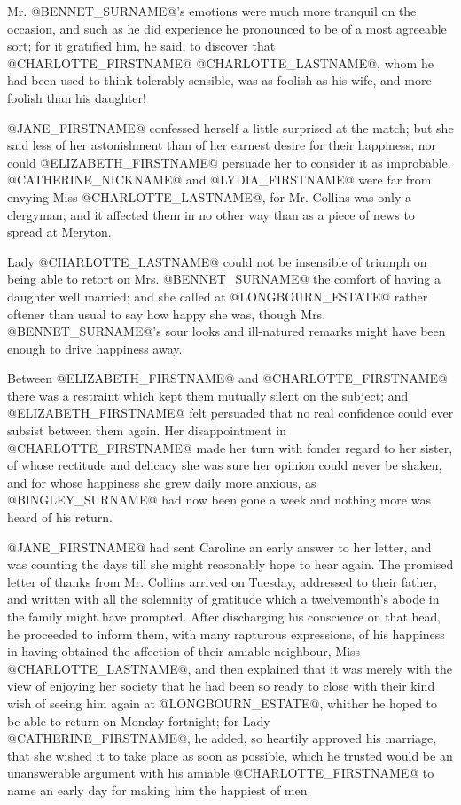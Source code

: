 Mr. @BENNET_SURNAME@'s emotions were much more tranquil on the occasion, and such
as he did experience he pronounced to be of a most agreeable sort; for
it gratified him, he said, to discover that @CHARLOTTE_FIRSTNAME@ @CHARLOTTE_LASTNAME@, whom he had
been used to think tolerably sensible, was as foolish as his wife, and
more foolish than his daughter!

@JANE_FIRSTNAME@ confessed herself a little surprised at the match; but she said
less of her astonishment than of her earnest desire for their happiness;
nor could @ELIZABETH_FIRSTNAME@ persuade her to consider it as improbable. @CATHERINE_NICKNAME@
and @LYDIA_FIRSTNAME@ were far from envying Miss @CHARLOTTE_LASTNAME@, for Mr. Collins was only a
clergyman; and it affected them in no other way than as a piece of news
to spread at Meryton.

Lady @CHARLOTTE_LASTNAME@ could not be insensible of triumph on being able to retort
on Mrs. @BENNET_SURNAME@ the comfort of having a daughter well married; and she
called at @LONGBOURN_ESTATE@ rather oftener than usual to say how happy she was,
though Mrs. @BENNET_SURNAME@'s sour looks and ill-natured remarks might have been
enough to drive happiness away.

Between @ELIZABETH_FIRSTNAME@ and @CHARLOTTE_FIRSTNAME@ there was a restraint which kept them
mutually silent on the subject; and @ELIZABETH_FIRSTNAME@ felt persuaded that
no real confidence could ever subsist between them again. Her
disappointment in @CHARLOTTE_FIRSTNAME@ made her turn with fonder regard to her
sister, of whose rectitude and delicacy she was sure her opinion could
never be shaken, and for whose happiness she grew daily more anxious,
as @BINGLEY_SURNAME@ had now been gone a week and nothing more was heard of his
return.

@JANE_FIRSTNAME@ had sent Caroline an early answer to her letter, and was counting
the days till she might reasonably hope to hear again. The promised
letter of thanks from Mr. Collins arrived on Tuesday, addressed to
their father, and written with all the solemnity of gratitude which a
twelvemonth's abode in the family might have prompted. After discharging
his conscience on that head, he proceeded to inform them, with many
rapturous expressions, of his happiness in having obtained the affection
of their amiable neighbour, Miss @CHARLOTTE_LASTNAME@, and then explained that it was
merely with the view of enjoying her society that he had been so ready
to close with their kind wish of seeing him again at @LONGBOURN_ESTATE@, whither
he hoped to be able to return on Monday fortnight; for Lady @CATHERINE_FIRSTNAME@,
he added, so heartily approved his marriage, that she wished it to take
place as soon as possible, which he trusted would be an unanswerable
argument with his amiable @CHARLOTTE_FIRSTNAME@ to name an early day for making him
the happiest of men.

